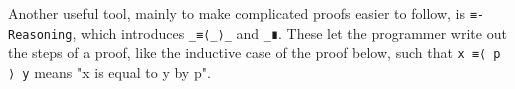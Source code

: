 Another useful tool, mainly to make complicated proofs easier to follow, is \texttt{≡-Reasoning},
which introduces \texttt{\_≡⟨\_⟩\_} and \texttt{\_∎}.
These let the programmer write out the steps of a proof, like the inductive case of the proof below,
such that \texttt{x ≡⟨ p ⟩ y} means "x is equal to y by p".
\begin{code}%
\>[0]\AgdaSpace{}%
\<%
\\
\>[0]\AgdaSpace{}%
\AgdaSymbol{:}%
\>[189I]\AgdaSymbol{\{}\AgdaSpace{}%
\AgdaSpace{}%
\AgdaSymbol{:}\AgdaSpace{}%
\AgdaSymbol{\}}\AgdaSpace{}%
\AgdaSymbol{\{}\AgdaSpace{}%
\AgdaSpace{}%
\AgdaSymbol{:}\AgdaSpace{}%
\AgdaSymbol{\}}\AgdaSpace{}%
\AgdaSpace{}%
\AgdaSymbol{(}\AgdaSpace{}%
\AgdaSymbol{:}\AgdaSpace{}%
\AgdaSpace{}%
\AgdaSpace{}%
\AgdaSymbol{)}\AgdaSpace{}%
\AgdaSymbol{(}\AgdaSpace{}%
\AgdaSymbol{:}\AgdaSpace{}%
\AgdaSpace{}%
\AgdaSpace{}%
\AgdaSymbol{)}\AgdaSpace{}%
\AgdaSymbol{(}\AgdaSpace{}%
\AgdaSymbol{:}\AgdaSpace{}%
\AgdaSpace{}%
\AgdaSpace{}%
\AgdaSymbol{)}\<%
\\
\>[.][@{}l@{}]\<[189I]%
\>[13]\AgdaSpace{}%
\AgdaSpace{}%
\AgdaSpace{}%
\AgdaSymbol{(}\AgdaSpace{}%
\AgdaOperator{\AgdaFunction{++}}\AgdaSpace{}%
\AgdaSymbol{)}\AgdaSpace{}%
\AgdaSpace{}%
\AgdaSymbol{(}\AgdaSpace{}%
\AgdaSpace{}%
\AgdaSymbol{)}\AgdaSpace{}%
\AgdaOperator{\AgdaFunction{++}}\AgdaSpace{}%
\AgdaSymbol{(}\AgdaSpace{}%
\AgdaSpace{}%
\AgdaSymbol{)}\<%
\\
\>[0]\AgdaSpace{}%
\AgdaSpace{}%
\AgdaInductiveConstructor{[]}\AgdaSpace{}%
\AgdaSpace{}%
\AgdaSymbol{=}\AgdaSpace{}%
\<%
\\
\>[0]\AgdaSpace{}%
\AgdaSpace{}%
\AgdaSymbol{(}\AgdaSpace{}%
\AgdaOperator{\AgdaInductiveConstructor{::}}\AgdaSpace{}%
\AgdaSymbol{)}\AgdaSpace{}%
\AgdaSpace{}%
\AgdaSymbol{=}\AgdaSpace{}%
\AgdaSpace{}%
\AgdaSpace{}%
\AgdaSymbol{((}\AgdaSpace{}%

\end{code}
